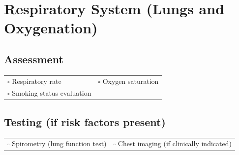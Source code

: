 
\section{Respiratory System (Lungs and Oxygenation)}
\label{sec:respiratory}

\subsection{Assessment}

\begin{tabular}{p{9cm} p{8cm}}
$\square$ Respiratory rate & $\square$ Oxygen saturation \\ 
$\square$ Smoking status evaluation & \\ 
\end{tabular}

\subsection{Testing (if risk factors present)}

\begin{tabular}{p{9cm} p{8cm}}
$\square$ Spirometry (lung function test) & $\square$ Chest imaging (if clinically indicated) \\ 
\end{tabular}

